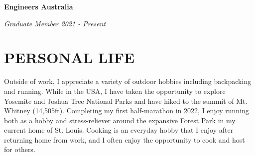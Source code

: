 \documentclass{article}
\begin{document}
  {\textbf{Engineers Australia}}

  \textit{Graduate Member \hfill 2021 - Present}

  \section*{\centering\uppercase{Personal Life}}

  Outside of work, I appreciate a variety of outdoor hobbies including backpacking and running. While in the USA, I have taken the opportunity to explore Yosemite and Joshua Tree National Parks and have hiked to the summit of Mt. Whitney (14,505ft). Completing my first half-marathon in 2022, I enjoy running both as a hobby and stress-reliever around the expansive Forest Park in my current home of St. Louis. Cooking is an everyday hobby that I enjoy after returning home from work, and I often enjoy the opportunity to cook and host for others.
\end{document}
